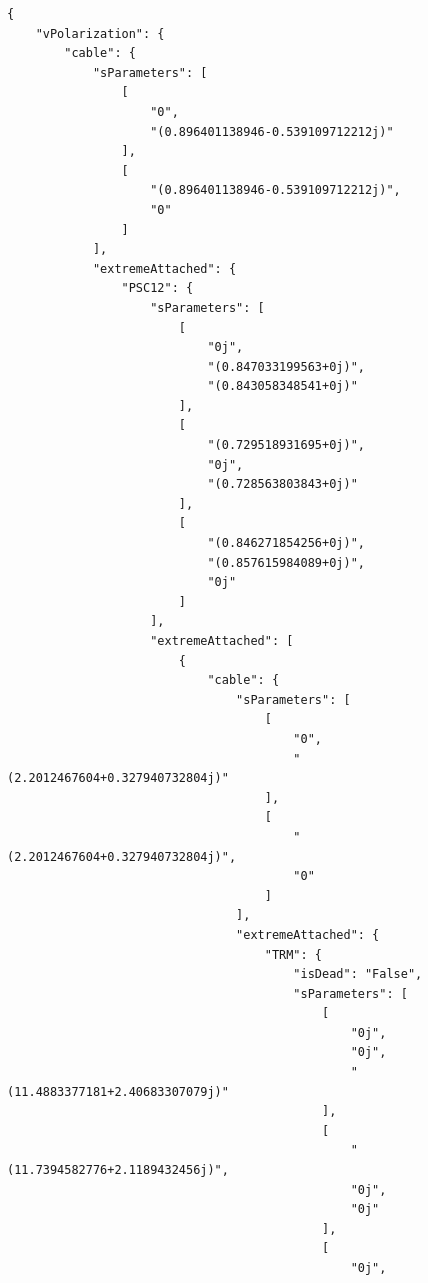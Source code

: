 \begin{verbatim}
{
    "vPolarization": {
        "cable": {
            "sParameters": [
                [
                    "0",
                    "(0.896401138946-0.539109712212j)"
                ],
                [
                    "(0.896401138946-0.539109712212j)",
                    "0"
                ]
            ],
            "extremeAttached": {
                "PSC12": {
                    "sParameters": [
                        [
                            "0j",
                            "(0.847033199563+0j)",
                            "(0.843058348541+0j)"
                        ],
                        [
                            "(0.729518931695+0j)",
                            "0j",
                            "(0.728563803843+0j)"
                        ],
                        [
                            "(0.846271854256+0j)",
                            "(0.857615984089+0j)",
                            "0j"
                        ]
                    ],
                    "extremeAttached": [
                        {
                            "cable": {
                                "sParameters": [
                                    [
                                        "0",
                                        "(2.2012467604+0.327940732804j)"
                                    ],
                                    [
                                        "(2.2012467604+0.327940732804j)",
                                        "0"
                                    ]
                                ],
                                "extremeAttached": {
                                    "TRM": {
                                        "isDead": "False",
                                        "sParameters": [
                                            [
                                                "0j",
                                                "0j",
                                                "(11.4883377181+2.40683307079j)"
                                            ],
                                            [
                                                "(11.7394582776+2.1189432456j)",
                                                "0j",
                                                "0j"
                                            ],
                                            [
                                                "0j",

\end{verbatim}
